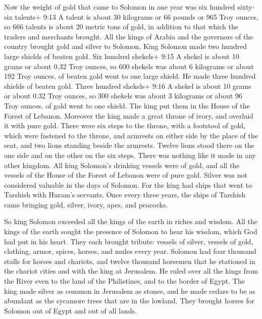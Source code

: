  Now the weight of gold that came to Solomon in one year
was six hundred sixty-six talents+ 9:13 A talent is about 30 kilograms
or 66 pounds or 965 Troy ounces, so 666 talents is about 20 metric tons
of gold,  in addition to that which the traders and
merchants brought. All the kings of Arabia and the governors of the
country brought gold and silver to Solomon.  King Solomon
made two hundred large shields of beaten gold. Six hundred shekels+ 9:15
A shekel is about 10 grams or about 0.32 Troy ounces, so 600 shekels was
about 6 kilograms or about 192 Troy ounces. of beaten gold went to one
large shield.  He made three hundred shields of beaten
gold. Three hundred shekels+ 9:16 A shekel is about 10 grams or about
0.32 Troy ounces, so 300 shekels was about 3 kilograms or about 96 Troy
ounces. of gold went to one shield. The king put them in the House of
the Forest of Lebanon.  Moreover the king made a great
throne of ivory, and overlaid it with pure gold.  There
were six steps to the throne, with a footstool of gold, which were
fastened to the throne, and armrests on either side by the place of the
seat, and two lions standing beside the armrests.  Twelve
lions stood there on the one side and on the other on the six steps.
There was nothing like it made in any other kingdom.  All
king Solomon's drinking vessels were of gold, and all the vessels of the
House of the Forest of Lebanon were of pure gold. Silver was not
considered valuable in the days of Solomon.  For the king
had ships that went to Tarshish with Huram's servants. Once every three
years, the ships of Tarshish came bringing gold, silver, ivory, apes,
and peacocks.

 So king Solomon exceeded all the kings of the earth in
riches and wisdom.  All the kings of the earth sought the
presence of Solomon to hear his wisdom, which God had put in his heart.
 They each brought tribute: vessels of silver, vessels of
gold, clothing, armor, spices, horses, and mules every year.
 Solomon had four thousand stalls for horses and chariots,
and twelve thousand horsemen that he stationed in the chariot cities and
with the king at Jerusalem.  He ruled over all the kings
from the River even to the land of the Philistines, and to the border of
Egypt.  The king made silver as common in Jerusalem as
stones, and he made cedars to be as abundant as the sycamore trees that
are in the lowland.  They brought horses for Solomon out of
Egypt and out of all lands.

